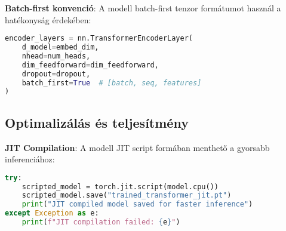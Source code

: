 \textbf{Batch-first konvenció}: A modell batch-first tenzor formátumot használ a hatékonyság érdekében:
\begin{lstlisting}[language=Python]
encoder_layers = nn.TransformerEncoderLayer(
    d_model=embed_dim,
    nhead=num_heads,
    dim_feedforward=dim_feedforward,
    dropout=dropout,
    batch_first=True  # [batch, seq, features]
)
\end{lstlisting}

\subsection{Optimalizálás és teljesítmény}
\textbf{JIT Compilation}: A modell JIT script formában menthető a gyorsabb inferenciához:
\begin{lstlisting}[language=Python]
try:
    scripted_model = torch.jit.script(model.cpu())
    scripted_model.save("trained_transformer_jit.pt")
    print("JIT compiled model saved for faster inference")
except Exception as e:
    print(f"JIT compilation failed: {e}")
\end{lstlisting}